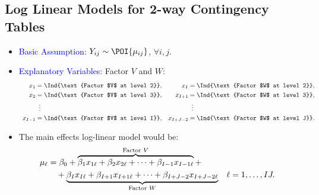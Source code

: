 \documentclass[oneside]{book}\usepackage[]{graphicx}\usepackage[svgnames]{xcolor}
\let\log\relax%
\begin{document}
\subsection*{Log Linear Models for 2-way Contingency Tables}
\begin{itemize}
      \item \textcolor{Blue}{Basic Assumption}: $ Y_{ij} \sim \POI{\mu_{ij}} $, $ \forall i,j $.
      \item \textcolor{Blue}{Explanatory Variables}: Factor $V$ and $W$:
            \[ \begin{array}{cc}
                        \begin{aligned}
                              x_1     & =\Ind{\text{Factor $V$ at level 2}}, \\
                              x_2     & =\Ind{\text{Factor $V$ at level 3}}, \\
                                      & \vdotswithin{=}                      \\
                              x_{I-1} & =\Ind{\text{Factor $V$ at level I}}, \\
                        \end{aligned} &
                        \begin{aligned}
                              x_I       & =\Ind{\text{Factor $W$ at level 2}}, \\
                              x_{I+1}   & =\Ind{\text{Factor $W$ at level 3}}, \\
                                        & \vdotswithin{=}                      \\
                              x_{I+J-2} & =\Ind{\text{Factor $W$ at level J}}. \\
                        \end{aligned}
                  \end{array} \]
      \item The main effects log-linear model would be:
            \begin{align*}
                  \log{\mu_\ell}
                   & =\beta_0+\overbrace{\beta_1x_{1\ell}+\beta_2x_{2\ell}+\cdots+\beta_{I-1}x_{I-1\ell}}^{\text{Factor $V$}}+                               \\
                   & \quad+\underbrace{\beta_Ix_{I\ell}+\beta_{I+1}x_{I+1\ell}+\cdots+\beta_{I+J-2}x_{I+J-2\ell}}_{\text{Factor $W$}} &  & \ell=1,\ldots,IJ.
            \end{align*}

\end{itemize}
\end{document}
